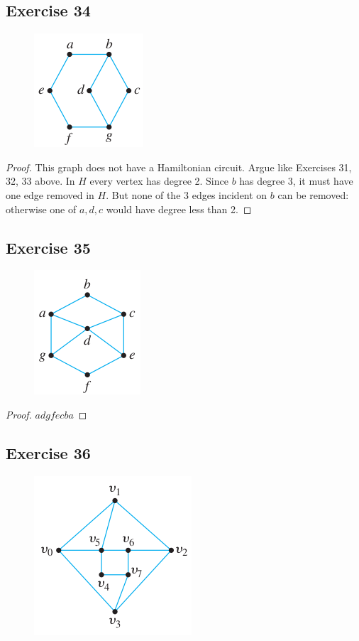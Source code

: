 \documentclass[14pt]{extarticle}
\begin{document}
\subsection{Exercise 34}
\begin{figure}[ht!]
\centering
\includegraphics[scale=0.8]{../images/10.1.34.png}
\end{figure}

\begin{proof}
This graph does not have a Hamiltonian circuit. Argue like Exercises 31, 32, 33 above. In \(H\) every vertex has degree 
2. Since \(b\) has degree 3, it must have one edge removed in \(H\). But none of the 3 edges incident on \(b\) can be 
removed: otherwise one of \(a,d,c\) would have degree less than 2.
\end{proof}

\subsection{Exercise 35}
\begin{figure}[ht!]
\centering
\includegraphics[scale=0.7]{../images/10.1.35.png}
\end{figure}

\begin{proof}
\(adgfecba\)
\end{proof}

\subsection{Exercise 36}
\begin{figure}[ht!]
\centering
\includegraphics[scale=0.6]{../images/10.1.36.png}
\end{figure}
\end{document}
